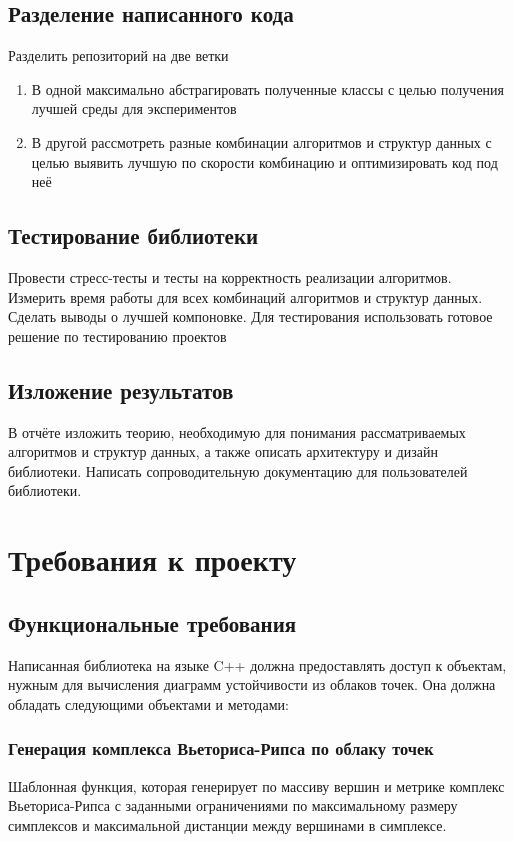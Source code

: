 \documentclass{article}
\begin{document}
\subsection*{Разделение написанного кода}
Разделить репозиторий на две ветки
\begin{enumerate}
  \item В одной максимально абстрагировать полученные классы с целью получения лучшей среды для экспериментов
  \item В другой рассмотреть разные комбинации алгоритмов и структур данных с целью выявить лучшую по скорости комбинацию и оптимизировать код под неё
\end{enumerate}

\subsection*{Тестирование библиотеки}
Провести стресс-тесты и тесты на корректность реализации алгоритмов. Измерить время работы для всех комбинаций алгоритмов и структур данных. Сделать выводы о лучшей компоновке. Для тестирования использовать готовое решение по тестированию проектов \cite{googletest}
\subsection*{Изложение результатов}
В отчёте изложить теорию, необходимую для понимания рассматриваемых алгоритмов и структур данных, а также описать архитектуру и дизайн библиотеки. Написать сопроводительную документацию для пользователей библиотеки.

\section{Требования к проекту}
\subsection{Функциональные требования}
Написанная библиотека на языке C++ должна предоставлять доступ к объектам, нужным для вычисления диаграмм устойчивости из облаков точек. Она должна обладать следующими объектами и методами:
\subsubsection{Генерация комплекса Вьеториса-Рипса по облаку точек}
Шаблонная функция, которая генерирует по массиву вершин и метрике комплекс Вьеториса-Рипса с заданными ограничениями по максимальному размеру симплексов и максимальной дистанции между вершинами в симплексе.
\end{document}

